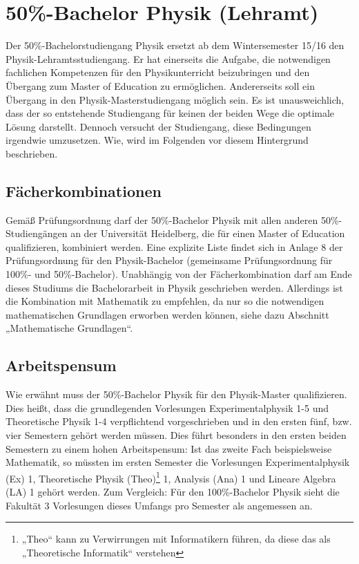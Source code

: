 \section{50\%-Bachelor Physik (Lehramt)} %

Der 50\%-Bachelorstudiengang Physik ersetzt ab dem Wintersemester 15/16 den Physik-Lehramtsstudiengang. Er hat einerseits die Aufgabe, die notwendigen fachlichen Kompetenzen für den Physikunterricht beizubringen und den Übergang zum Master of Education zu ermöglichen. Andererseits soll ein Übergang in den Physik-Masterstudiengang möglich sein. Es ist unausweichlich, dass der so entstehende Studiengang für keinen der beiden Wege die optimale Lösung darstellt. Dennoch versucht der Studiengang, diese Bedingungen irgendwie umzusetzen. Wie, wird im Folgenden vor diesem Hintergrund beschrieben.

\subsection{Fächerkombinationen}

Gemäß Prüfungsordnung darf der 50\%-Bachelor Physik mit allen anderen 50\%-Studiengängen an der Universität Heidelberg, die für einen Master of Education qualifizieren, kombiniert werden. Eine explizite Liste findet sich in Anlage 8 der Prüfungsordnung für den Physik-Bachelor (gemeinsame Prüfungsordnung für 100\%- und 50\%-Bachelor). Unabhängig von der Fächerkombination darf am Ende dieses Studiums die Bachelorarbeit in Physik geschrieben werden. Allerdings ist die Kombination mit Mathematik zu empfehlen, da nur so die notwendigen mathematischen Grundlagen erworben werden können, siehe dazu Abschnitt „Mathematische Grundlagen“.

\subsection{Arbeitspensum}

Wie erwähnt muss der 50\%-Bachelor Physik für den Physik-Master qualifizieren. Dies heißt, dass die grundlegenden Vorlesungen Experimentalphysik 1-5 und Theoretische Physik 1-4 verpflichtend vorgeschrieben und in den ersten fünf, bzw. vier Semestern gehört werden müssen. Dies führt besonders in den ersten beiden Semestern zu einem hohen Arbeitspensum: Ist das zweite Fach beispielsweise Mathematik, so müssten im ersten Semester die Vorlesungen Experimentalphysik (Ex) 1, Theoretische Physik (Theo)\footnote{„Theo“ kann zu Verwirrungen mit Informatikern führen, da diese das als „Theoretische Informatik“ verstehen} 1, Analysis (Ana) 1 und Lineare Algebra (LA) 1 gehört werden. Zum Vergleich: Für den 100\%-Bachelor Physik sieht die Fakultät 3 Vorlesungen dieses Umfangs pro Semester als angemessen an.

